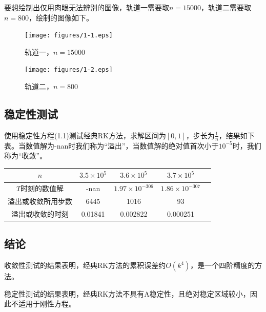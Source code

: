 \documentclass[lang=cn,10pt,bibend=bibtex]{elegantbook}
\begin{document}
要想绘制出仅用肉眼无法辨别的图像，轨道一需要取$n=15000$，轨道二需要取$n=800$，绘制的图像如下。

\vspace{-.8em}
\begin{figure}[H]
  \centering
  \begin{minipage}[t]{0.4\linewidth}
      \centering
      \texttt{[image: figures/1-1.eps]}
      \caption*{轨道一，$n=15000$}
  \end{minipage}
  \hspace{2em}
  \begin{minipage}[t]{0.4\linewidth}
      \centering
      \texttt{[image: figures/1-2.eps]}
      \caption*{轨道二，$n=800$}
  \end{minipage}
\end{figure}
\vspace{-2em}

\subsection{稳定性测试}
\vspace{-.8em}

使用稳定性方程(1.1)测试经典RK方法，求解区间为$[0,1]$，步长为$\frac{1}{n}$，结果如下表。当数值解为-nan时我们称为“溢出”，当数值解的绝对值首次小于$10^{-5}$时，我们称为“收敛”。

\begin{table}[htbp]
  \centering
  \renewcommand\arraystretch{1.1}
  \begin{tabular}{c|cccc}
    $n$ & $3.5\times 10^5$ & $3.6\times 10^5$ & $3.7\times 10^5$ \\ \hline
    $T$时刻的数值解 & -nan & $1.97\times 10^{-306}$ & $1.86\times 10^{-307}$\\
    溢出或收敛所用步数 & 6445 & 1016 & 93 \\
    溢出或收敛的时刻 & 0.01841 & 0.002822 & 0.000251
  \end{tabular}
\end{table}
\vspace{-.8em}
\subsection{结论}
\vspace{-.8em}

收敛性测试的结果表明，经典RK方法的累积误差约$O(k^4)$，是一个四阶精度的方法。

稳定性测试的结果表明，经典RK方法不具有A稳定性，且绝对稳定区域较小，因此不适用于刚性方程。
\end{document}
